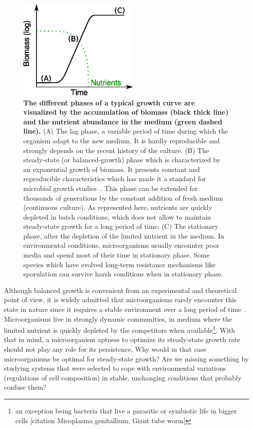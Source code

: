 \begin{figure}[tb]
\centering
\includegraphics[height=5cm]{./Fig/Chapter1/growth_curve.eps}
\caption{
\textbf{The different phases of a typical growth curve are visualized by the accumulation of biomass (black thick line) and the nutrient abundance in the medium (green dashed line).}
(A) The lag phase, a variable period of time during which the organism adapt to the new medium.
It is hardly reproducible and strongly depends on the recent history of the culture.
(B) The steady-state (or balanced-growth) phase which is characterized by an exponential growth of biomass.
It presents constant and reproducible characteristics which has made it a standard for microbial growth studies~\cite{schaechter_microbe_2006}.
This phase can be extended for thousands of generations by the constant addition of fresh medium (continuous culture).
As represented here, nutrients are quickly depleted in batch conditions, which does not allow to maintain steady-state growth for a long period of time.
(C) The stationary phase, after the depletion of the limited nutrient in the medium.
In environmental conditions, microorganisms usually encounter poor media and spend most of their time in stationary phase.
Some species which have evolved long-term resistance mechanisms like sporulation can survive harsh conditions when in stationary phase.
}
\label{fig:growth_curve}
\end{figure}

Although balanced growth is convenient from an experimental and theoretical point of view, it is widely admitted that microorganisms rarely encounter this state in nature since it requires a stable environment over a long period of time~\cite{schaechter_microbe_2006}.
Microorganisms live in strongly dynamic communities, in medium where the limited nutrient is quickly depleted by the competitors when available\footnote{an exception being bacteria that live a parasitic or symbiotic life in bigger cells [citation Micoplasma genitallium, Giant tube worm]}.
With that in mind, a microorganism aptness to optimize its steady-state growth rate should not play any role for its persistence.
Why would in that case microorganisms be optimal for steady-state growth?
Are we missing something by studying systems that were selected to cope with environmental variations (regulations of cell composition) in stable, unchanging conditions that probably confuse them?

